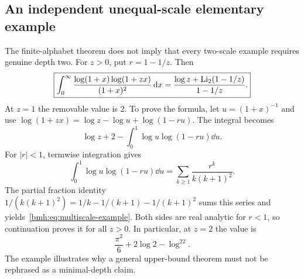 \subsection{An independent unequal-scale elementary example}
The finite-alphabet theorem does not imply that every two-scale example
requires genuine depth two. For $z>0$, put $r=1-1/z$. Then
\begin{equation}\label{bmh:eq:multiscale-example}
 \boxed{\displaystyle
 \int_0^\infty\frac{\log(1+x)\log(1+zx)}{(1+x)^2}\,\mathrm d x
 =\frac{\log z+\operatorname{Li}_2(1-1/z)}{1-1/z}.}
\end{equation}
At $z=1$ the removable value is $2$. To prove the formula, let
$u=(1+x)^{-1}$ and use
$\log(1+zx)=\log z-\log u+\log(1-ru)$.
The integral becomes
\[
 \log z+2-\int_0^1\log u\log(1-ru)\dd u.
\]
For $|r|<1$, termwise integration gives
\[
 \int_0^1\log u\log(1-ru)\dd u
 =\sum_{k\ge1}\frac{r^k}{k(k+1)^2}.
\]
The partial fraction identity
$1/(k(k+1)^2)=1/k-1/(k+1)-1/(k+1)^2$
sums this series and yields~\eqref{bmh:eq:multiscale-example}.
Both sides are real analytic for $r<1$, so continuation proves it for
all $z>0$. In particular, at $z=2$ the value is
\begin{equation}\label{bmh:eq:multiscale2}
 \frac{\pi^2}{6}+2\log2-\log^22.
\end{equation}
The example illustrates why a general upper-bound theorem must not be
rephrased as a minimal-depth claim.
